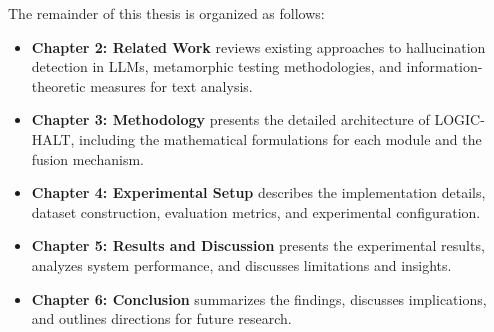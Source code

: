 The remainder of this thesis is organized as follows:

\begin{itemize}
    \item \textbf{Chapter 2: Related Work} reviews existing approaches to hallucination detection in LLMs, metamorphic testing methodologies, and information-theoretic measures for text analysis.

    \item \textbf{Chapter 3: Methodology} presents the detailed architecture of LOGIC-HALT, including the mathematical formulations for each module and the fusion mechanism.

    \item \textbf{Chapter 4: Experimental Setup} describes the implementation details, dataset construction, evaluation metrics, and experimental configuration.

    \item \textbf{Chapter 5: Results and Discussion} presents the experimental results, analyzes system performance, and discusses limitations and insights.

    \item \textbf{Chapter 6: Conclusion} summarizes the findings, discusses implications, and outlines directions for future research.
\end{itemize}
